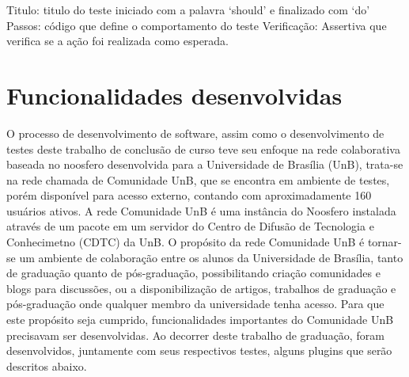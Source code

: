 Titulo: titulo do teste iniciado com a palavra ‘should’ e finalizado com ‘do’
%
Passos: código que define o comportamento do teste
%
Verificação: Assertiva que verifica se a ação foi realizada como esperada.


\section{Funcionalidades desenvolvidas}
O processo de desenvolvimento de software, assim como o desenvolvimento de testes 
deste trabalho de conclusão de curso teve seu enfoque na rede colaborativa baseada 
no noosfero desenvolvida para a Universidade de Brasília (UnB), trata-se na rede 
chamada de Comunidade UnB, que se encontra em ambiente de testes, porém disponível 
para acesso externo, contando com aproximadamente 160 usuários ativos. A rede 
Comunidade UnB é uma instância do Noosfero instalada através de um pacote em um 
servidor do Centro de Difusão de Tecnologia e Conhecimetno (CDTC) da UnB.
%
O propósito da rede Comunidade UnB é tornar-se um ambiente de colaboração entre os 
alunos da Universidade de Brasília, tanto de graduação quanto de pós-graduação, 
possibilitando criação comunidades e blogs para discussões, ou a disponibilização 
de artigos, trabalhos de graduação e pós-graduação onde qualquer membro da universidade 
tenha acesso.
%
Para que este propósito seja cumprido, funcionalidades importantes do Comunidade 
UnB precisavam ser desenvolvidas. Ao decorrer deste trabalho de graduação, foram 
desenvolvidos, juntamente com seus respectivos testes, alguns plugins que serão 
descritos abaixo.
